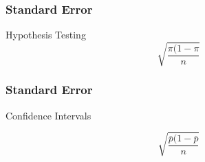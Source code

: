 
\begin{frame}
\frametitle{Standard Error}
Hypothesis Testing
\[\sqrt{\frac{\pi (1- \pi}{n}}\]

\end{frame}
\begin{frame}
\frametitle{Standard Error}
Confidence Intervals

\[\sqrt{\frac{\bar{p} (1- \bar{p}}{n}}\]

\end{frame}
